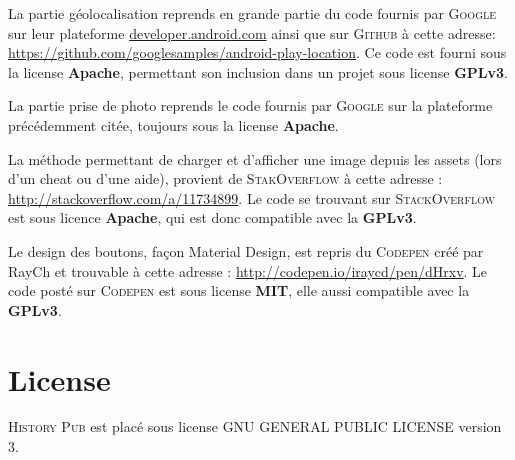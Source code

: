 \documentclass[11pt]{scrreprt}
\begin{document}
    \begin{description}[style=nextline]
        \item[EtapeActivity.java et PhotoActivity.java] La partie géolocalisation reprends en grande partie du code fournis par \textsc{Google} sur leur plateforme \url{developer.android.com} ainsi que sur \textsc{Github} à cette adresse: \url{https://github.com/googlesamples/android-play-location}. Ce code est fourni sous la license \textbf{Apache}, permettant son inclusion dans un projet sous license \textbf{GPLv3}.
        \item[PhotoActivity.java] La partie prise de photo reprends le code fournis par \textsc{Google} sur la plateforme précédemment citée, toujours sous la license \textbf{Apache}.
        \item[PhotoActivity.java] La méthode permettant de charger et d'afficher une image depuis les assets (lors d'un cheat ou d'une aide), provient de \textsc{StakOverflow} à cette adresse : \url{http://stackoverflow.com/a/11734899}. Le code se trouvant sur \textsc{StackOverflow} est sous licence \textbf{Apache}, qui est donc compatible avec la \textbf{GPLv3}.
        \item[Style.css] Le design des boutons, façon Material Design, est repris du \textsc{Codepen} créé par RayCh et trouvable à cette adresse : \url{http://codepen.io/iraycd/pen/dHrxv}. Le code posté sur \textsc{Codepen} est sous license \textbf{MIT}, elle aussi compatible avec la \textbf{GPLv3}.
    \end{description}

    \chapter{License}

    \noindent \textsc{History Pub} est placé sous license GNU GENERAL PUBLIC LICENSE version 3.
    \hfill\\
\end{document}
